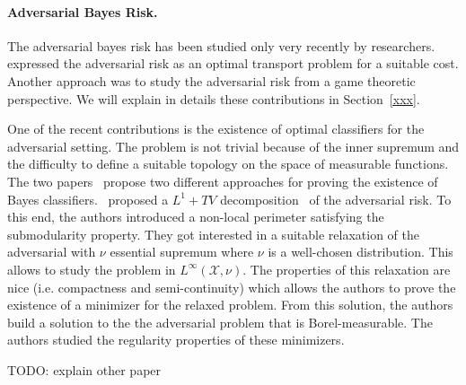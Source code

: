 \paragraph{Adversarial Bayes Risk.} The adversarial bayes risk has been studied only very recently by researchers.~\cite{xxx} expressed the adversarial risk as an optimal transport problem for a suitable cost. Another approach was to study the adversarial risk from a game theoretic perspective. We will explain in details these contributions in Section~\ref{xxx}. 


One of the recent contributions is the existence of  optimal classifiers for the adversarial setting.  The problem is not trivial because of the inner supremum and the difficulty to define a suitable topology on the space of measurable functions. The two papers~\citep{xxx} propose two different approaches for proving the existence of Bayes classifiers.~\cite{xxx} proposed a $L^1+TV$ decomposition~\citep{xxx} of the adversarial risk.  To this end, the authors introduced a non-local perimeter satisfying the submodularity property. They got interested in a suitable relaxation of the adversarial with $\nu$ essential supremum where $\nu$ is a well-chosen distribution. This allows to study the problem in $L^\infty(\mathcal{X},\nu)$. The properties of this relaxation are nice (i.e. compactness and semi-continuity) which allows the authors to prove the existence of a minimizer for the relaxed problem. From this solution, the authors build a solution to the the adversarial problem that is Borel-measurable. The authors studied the regularity properties of these minimizers.

TODO: explain other paper
 